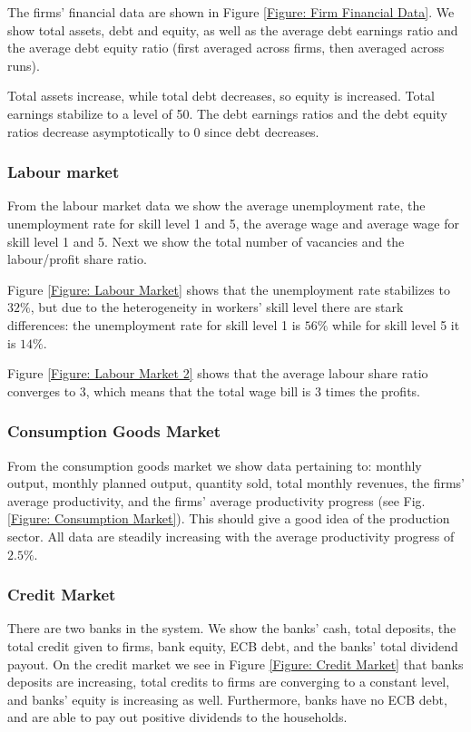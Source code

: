 The firms' financial data are shown in Figure \ref{Figure: Firm Financial Data}. We show total assets, debt and equity, as well as
the average debt earnings ratio and the average debt equity ratio (first averaged across firms, then averaged across runs).

Total assets increase, while total debt decreases, so equity is increased. Total earnings stabilize to a level of 50.
The debt earnings ratios and the debt equity ratios decrease asymptotically to 0 since debt decreases.

\subsubsection*{Labour market}
From the labour market data we show the average unemployment rate, the unemployment rate for skill level 1 and 5, the average wage and 
average wage for skill level 1 and 5. Next we show the total number of vacancies and the labour/profit share ratio.

Figure \ref{Figure: Labour Market} shows that the unemployment rate stabilizes to $32\%$, but due to the heterogeneity in workers' skill level there are stark differences: the unemployment rate for skill level 1 is $56\%$ while for skill level  5 it is $14\%$.

Figure \ref{Figure: Labour Market 2} shows that the average labour share ratio converges to 3, which means that the total wage bill is 3 times the profits.

\subsubsection*{Consumption Goods Market}
From the consumption goods market we show data pertaining to: monthly output, monthly planned output, quantity sold, total monthly revenues,
the firms' average productivity, and the firms' average productivity progress (see Fig. \ref{Figure: Consumption Market}). This should give a good idea of the production sector.
All data are steadily increasing with the average productivity progress of $2.5\%$.

\subsubsection*{Credit Market}
There are two banks in the system. 
We show the banks' cash, total deposits, the total credit given to firms, bank equity, ECB debt, and the banks' total dividend payout.
On the credit market we see in Figure \ref{Figure: Credit Market} that banks deposits are increasing, total credits to firms are converging to a constant level, and banks' equity is increasing as well. Furthermore, banks have no ECB debt, and are able to pay out positive dividends to the households.


